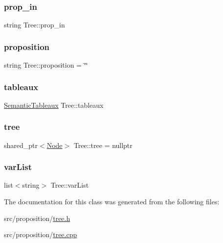 \subsubsection{\texorpdfstring{prop\+\_\+in}{prop\_in}}
{\footnotesize\ttfamily string Tree\+::prop\+\_\+in\hspace{0.3cm}{\ttfamily [protected]}}

\mbox{\label{class_tree_a43a26e394162774b0e0614e6567f5fe1}} 
\subsubsection{\texorpdfstring{proposition}{proposition}}
{\footnotesize\ttfamily string Tree\+::proposition = \char`\"{}\char`\"{}\hspace{0.3cm}{\ttfamily [private]}}

\mbox{\label{class_tree_ae9dd5a4ebbf36cd6a952c78139221cad}} 
\subsubsection{\texorpdfstring{tableaux}{tableaux}}
{\footnotesize\ttfamily \hyperlink{class_semantic_tableaux}{Semantic\+Tableaux} Tree\+::tableaux\hspace{0.3cm}{\ttfamily [private]}}

\mbox{\label{class_tree_a9c0875a8767528453814b8e3daf8f9af}} 
\subsubsection{\texorpdfstring{tree}{tree}}
{\footnotesize\ttfamily shared\+\_\+ptr$<$\hyperlink{class_node}{Node}$>$ Tree\+::tree = nullptr\hspace{0.3cm}{\ttfamily [protected]}}

\mbox{\label{class_tree_a38bca58f3aef44e939f69f092037af50}} 
\subsubsection{\texorpdfstring{var\+List}{varList}}
{\footnotesize\ttfamily list$<$string$>$ Tree\+::var\+List\hspace{0.3cm}{\ttfamily [protected]}}



The documentation for this class was generated from the following files\+:\begin{DoxyCompactItemize}
\item 
src/proposition/\hyperlink{tree_8h}{tree.\+h}\item 
src/proposition/\hyperlink{tree_8cpp}{tree.\+cpp}\end{DoxyCompactItemize}
